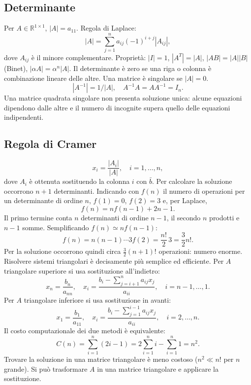 \documentclass[11pt,a4paper]{article}
\newcommand{\R}{\mathbb R}\newcommand{\F}{\mathbb F}\newcommand{\tr}{\operatorname{tr}}\newcommand{\ar}{\operatorname{arr}}\newcommand{\fl}{\operatorname{fl}}
\newcommand{\pagina}[1]{\clearpage}
\begin{document}
\subsection*{Determinante}
Per $A\in\R^{1\times1}$, $|A|=a_{11}$. Regola di Laplace:
\[|A|=\sum_{j=1}^n a_{ij}(-1)^{i+j}|A_{ij}|,\]
dove $A_{ij}$ è il minore complementare. Proprietà: $|I|=1$, $|A^T|=|A|$, $|AB|=|A||B|$ (Binet), $|\alpha A|=\alpha^n|A|$. Il determinante è zero se una riga o colonna è combinazione lineare delle altre. Una matrice è singolare se $|A|=0$.
\[|A^{-1}|=1/|A|,\quad A^{-1}A=AA^{-1}=I_n.\]
Una matrice quadrata singolare non presenta soluzione unica: alcune equazioni dipendono dalle altre e il numero di incognite supera quello delle equazioni indipendenti.
\pagina{18}\subsection*{Regola di Cramer}
\[x_i=\frac{|A_i|}{|A|},\quad i=1,\ldots,n,\]
dove $A_i$ è ottenuta sostituendo la colonna $i$ con $\bar b$. Per calcolare la soluzione occorrono $n+1$ determinanti. Indicando con $f(n)$ il numero di operazioni per un determinante di ordine $n$, $f(1)=0$, $f(2)=3$ e, per Laplace,
\[f(n)=nf(n-1)+2n-1.\]
Il primo termine conta $n$ determinanti di ordine $n-1$, il secondo $n$ prodotti e $n-1$ somme. Semplificando $f(n)\simeq nf(n-1)$:
\[f(n)=n(n-1)\cdots3f(2)=\frac{n!}{2}\,3=\frac32n!.\]
Per la soluzione occorrono quindi circa $\frac32(n+1)!$ operazioni: numero enorme.
\pagina{19}
Risolvere sistemi triangolari è decisamente più semplice ed efficiente. Per $A$ triangolare superiore si usa sostituzione all'indietro:
\[x_n=\frac{b_n}{a_{nn}},\quad x_i=\frac{b_i-\sum_{j=i+1}^n a_{ij}x_j}{a_{ii}},\quad i=n-1,\ldots,1.\]
Per $A$ triangolare inferiore si usa sostituzione in avanti:
\[x_1=\frac{b_1}{a_{11}},\quad x_i=\frac{b_i-\sum_{j=1}^{i-1}a_{ij}x_j}{a_{ii}},\quad i=2,\ldots,n.\]
Il costo computazionale dei due metodi è equivalente:
\[C(n)=\sum_{i=1}^n(2i-1)=2\sum_{i=1}^n i-\sum_{i=1}^n1=n^2.\]
\pagina{20}
Trovare la soluzione in una matrice triangolare è meno costoso ($n^2\ll n!$ per $n$ grande). Si può trasformare $A$ in una matrice triangolare e applicare la sostituzione.
\end{document}
